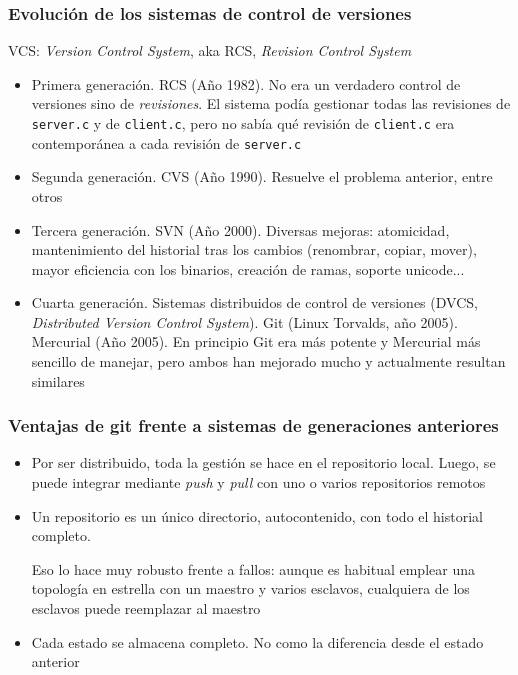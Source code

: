 \documentclass[ucs]{beamer}
\begin{document}
\begin{frame}[fragile]
\frametitle{Evolución de los sistemas de control de versiones}

VCS: \emph{Version Control System}, aka RCS, \emph{Revision Control System}
\begin{itemize}
\item
Primera generación. RCS (Año 1982). No era un verdadero control de versiones sino
de \emph{revisiones}. El sistema podía gestionar todas las revisiones 
de \verb|server.c|
y 
de \verb|client.c|,
pero no sabía qué revisión de \verb|client.c| era contemporánea a cada revisión de \verb|server.c|
\item
Segunda generación. CVS (Año 1990). Resuelve el problema anterior, entre otros


\end{itemize}


\end{frame}
\begin{frame}[fragile]

\begin{itemize}

\item
Tercera generación. SVN (Año 2000). Diversas mejoras: atomicidad, mantenimiento del historial
tras los cambios (renombrar, copiar, mover), mayor eficiencia con los binarios, creación
de ramas, soporte unicode...
\item
Cuarta generación. Sistemas distribuidos de control de versiones 
(DVCS, \emph{Distributed Version Control System}). Git (Linux Torvalds, año 2005). Mercurial (Año 2005).
En principio Git era más potente y Mercurial más sencillo de manejar, pero ambos han
mejorado mucho y actualmente resultan similares
\end{itemize}

\end{frame}


\begin{frame}[fragile]
\frametitle{Ventajas de git frente a sistemas de generaciones anteriores}
\begin{itemize}
\item
Por ser distribuido, toda la gestión se hace en el repositorio local. Luego, se puede integrar
mediante \emph{push} y \emph{pull} con uno o varios repositorios remotos
\item
Un repositorio es un único directorio, autocontenido, con todo el historial completo.

Eso lo hace muy robusto frente a fallos: aunque es habitual emplear una topología en
estrella con un maestro y varios esclavos, cualquiera de los
esclavos puede reemplazar al maestro
\item
Cada estado se almacena completo. No como la diferencia desde el estado anterior
\end{itemize}

\end{frame}
\end{document}
